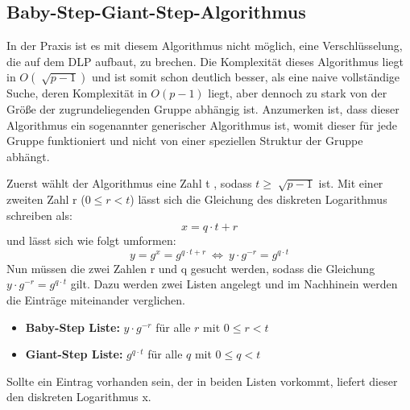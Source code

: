 	\subsection{Baby-Step-Giant-Step-Algorithmus}\label{Kapitel Baby Step Giant Step Algorithmus}
		In der Praxis ist es mit diesem Algorithmus nicht möglich, eine Verschlüsselung, die auf dem DLP aufbaut, zu brechen. Die Komplexität dieses Algorithmus liegt in $O(\sqrt[]{p-1})$ und ist somit schon deutlich besser, als eine naive vollständige Suche, deren Komplexität in $O(p-1)$ liegt, aber dennoch zu stark von der Größe der zugrundeliegenden Gruppe abhängig ist. Anzumerken ist, dass dieser Algorithmus ein sogenannter generischer Algorithmus ist, womit dieser für jede Gruppe funktioniert und nicht von einer speziellen Struktur der Gruppe abhängt.~\cite{Kryptografie:in:Theorie:und:Praxis}
		
		Zuerst wählt der Algorithmus eine Zahl t \myin {}, sodass $t \geq \sqrt[]{p-1}$ ist. Mit einer zweiten Zahl r ($0 \leq r<t$) lässt sich die Gleichung des diskreten Logarithmus schreiben als:
		\begin{equation}
			x = q \cdot t + r
			\label{Gleichung Diskreter Logarithmus}
		\end{equation}
		und lässt sich wie folgt umformen:
		\begin{equation}
			y = g^x = g^{q \cdot t + r}~\Leftrightarrow~y \cdot g^{-r} = g^{q \cdot t}
			\label{Gleichung Baby steps Giant steps}
		\end{equation}
		Nun müssen die zwei Zahlen r und q gesucht werden, sodass die Gleichung $y \cdot g^{-r} = g^{q \cdot t}$ gilt. Dazu werden zwei Listen angelegt und im Nachhinein werden die Einträge miteinander verglichen. 
		\begin{itemize}
			\item[] \textbf{Baby-Step Liste:} $y \cdot g^{-r}$ für alle $r$ mit $0 \leq r < t$
			\item[] \textbf{Giant-Step Liste:} $g^{q \cdot t}$ für alle $q$ mit $0 \leq q < t$
		\end{itemize}
		Sollte ein Eintrag vorhanden sein, der in beiden Listen vorkommt, liefert dieser den diskreten Logarithmus x.~\cite{Kryptografie:in:Theorie:und:Praxis}
		
